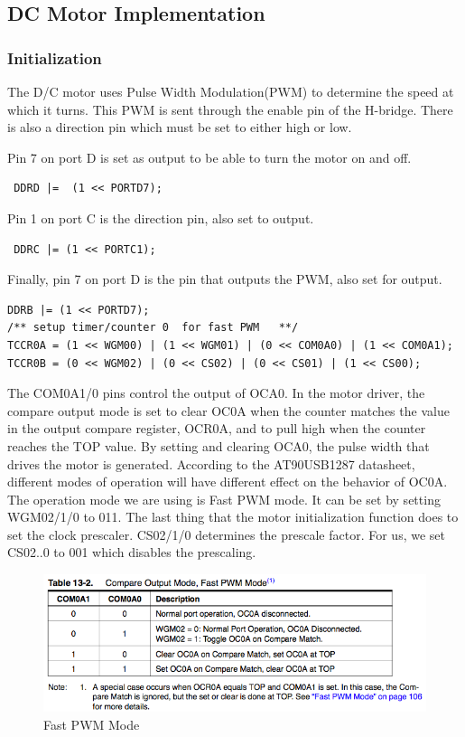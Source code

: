 \subsection{DC Motor Implementation}

\subsubsection{Initialization}
The D/C motor uses Pulse Width Modulation(PWM) to determine the speed at which it turns. This PWM is sent through the enable pin of the H-bridge. There is also a direction pin which must be set to either high or low.

Pin 7 on port D is set as output to be able to turn the motor on and off.
\begin{lstlisting}
 DDRD |=  (1 << PORTD7);
\end{lstlisting}

Pin 1 on port C is the direction pin, also set to output. 

\begin{lstlisting}
 DDRC |= (1 << PORTC1);
\end{lstlisting}

Finally, pin 7 on port D is the pin that outputs the PWM, also set for output. 

\begin{lstlisting}
DDRB |= (1 << PORTD7);
/** setup timer/counter 0  for fast PWM   **/ 
TCCR0A = (1 << WGM00) | (1 << WGM01) | (0 << COM0A0) | (1 << COM0A1);
TCCR0B = (0 << WGM02) | (0 << CS02) | (0 << CS01) | (1 << CS00);
\end{lstlisting}

The COM0A1/0 pins control the output of OCA0. In the motor driver, the compare output mode is set to clear OC0A when the counter matches the value in the output compare register, OCR0A, and to pull high when the counter reaches the TOP value. By setting and clearing OCA0, the pulse width that drives the motor is generated. According to the AT90USB1287 datasheet, different modes of operation will have different effect on the behavior of OC0A. The operation mode we are using is Fast PWM mode. It can be set by setting WGM02/1/0 to 011. The last thing that the motor initialization function does to set the clock prescaler. CS02/1/0 determines the prescale factor. For us, we set CS02..0 to 001 which disables the prescaling.

\begin{figure}[tbp]
  \begin{center}
    \includegraphics[width=125mm]{imageSources/pwmTable1.png}
  \end{center}
  \caption{Fast PWM Mode} 
  \label{pwmTable1}
\end{figure}

